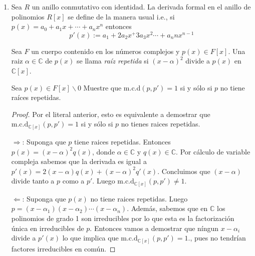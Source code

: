 \documentclass[letter,twoside,12pt]{article}
\begin{document}
\begin{enumerate}
\begin{enumerate}
\begin{proof}
Observación: Tanto en $ F[x] $ como en $ K[x] $ las unidades son los polinomios de grado 0, es decir las constantes. Esto es una consecuencia de la norma euclidea asociada a estos anillos.

$ \Leftarrow $: Si suponemos por contradicción que $ m= \text{m.c.d}_{F [x]}(p, q) \not = 1$ entonces $m$ es un polinomio de grado mayor a 0 que divide tanto a $p$ como a $q$. Entonces extendiendo a $ K[x] $, $ m $ sigue dividiendo tanto a $ p $ como a $ q $ y por lo tanto debe dividir a $ \text{m.c.d}_{K [x]}(p, q) $, que por lo tanto no puede ser igual a 1 porque $ m $ no es una unidad en $ K[x] $. 
\end{proof}
\item Sea $ R $ un anillo conmutativo con identidad. La derivada formal en el anillo de polinomios $ R[x] $ se
define de la manera usual i.e., si $ p(x) = a_0 + a_1x + \cdots + a_nx ^ n $ entonces
\begin{equation}
 p'(x) := a_1 + 2a_2x^+3a_3x^2 \cdots + a_nnx ^ {n-1} \nonumber
\end{equation}

Sea $ F $ un cuerpo contenido en los números complejos y $ p(x) \in F[x] $. Una raiz $ \alpha \in \mathbb{C} $ de $ p(x) $ se llama
\textit{raíz repetida} si $ (x - \alpha)^2 $  divide a $ p(x) $ en $ \mathbb{C}[x] $.

Sea $ p(x) \in F[x]\backslash{0} $ Muestre que m.c.d$ (p, p'
) = 1 $ si y sólo si $ p $ no tiene raíces repetidas.
\begin{proof}
Por el literal anterior, esto es equivalente a demostrar  que $ \text{m.c.d}_{\mathbb{C}[x]}(p, p') = 1 $ si y sólo si $ p $ no tienes raices repetidas.

$ \Rightarrow $: Suponga que $ p $ tiene raices repetidas. Entonces $ p(x) = (x-\alpha)^2q(x)$, donde $ \alpha \in \mathbb{C} $ y $ q(x) \in \mathbb{C} $. Por cálculo de variable compleja sabemos que la derivada es igual a $ p'(x) = 2(x-\alpha)q(x)+(x-\alpha)^2q'(x)$. Concluimos que $ (x-\alpha) $ divide tanto a $ p $ como a $ p' $. Luego $ \text{m.c.d}_{\mathbb{C}[x]}(p, p') \not = 1 $.

$ \Leftarrow $: Suponga que $ p(x) $ no tiene raices repetidas. Luego $ p = (x-\alpha_1)(x-\alpha_2)\cdots (x-\alpha_n) $. Además, sabemos que en $ \mathbb{C} $ los polinomios de grado 1 son irreducibles por lo que esta es la factorización única en irreducibles de $ p $. Entonces vamos a demostrar que níngun $ x- \alpha_i $ divide a $ p'(x) $ lo que implica que $ \text{m.c.d}_{\mathbb{C}[x]}(p, p') = 1 $., pues no tendrían factores irreducibles en común.


\end{proof}
\end{enumerate}
\end{enumerate}
\end{document}
